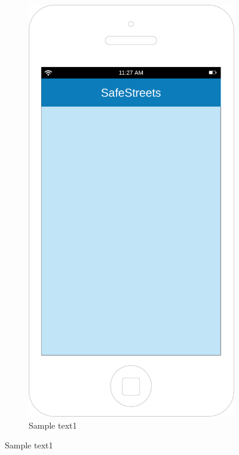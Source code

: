 \documentclass[12pt,a4paper]{report}
\begin{document}
		\begin{figure}[h]
		\begin{subfigure}{0.5\textwidth}
			\includegraphics[scale=0.25, center]{Background}
			\caption{Sample text1}
			\label{fig:subim1}
		\end{subfigure}

\end{figure}
\end{document}

